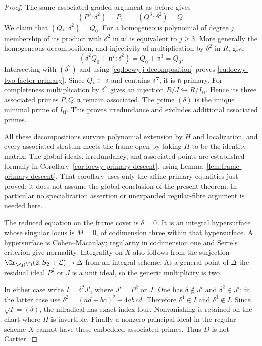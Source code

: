 \begin{proof}
The same associated-graded argument as before gives
\[
 (P^3:\delta^2)=P,\qquad (Q^3:\delta^2)=Q.
\]
We claim that $(Q_*:\delta^2)=Q_0$. For a homogeneous polynomial
of degree $j$, membership of its product with $\delta^2$ in
$\mathfrak n^7$ is equivalent to $j\ge3$. More generally the
homogeneous decomposition, and injectivity of multiplication by
$\delta^2$ in $R$, give
\[
 (\delta^2Q_0+\mathfrak n^7:\delta^2)
       =Q_0+\mathfrak n^3=Q_0.
\]
Intersecting with $(\delta^2)$ and using
\eqref{eq:loewy-j-decomposition} proves
\eqref{eq:loewy-two-factor-primary}. Since $Q_*\subset\mathfrak n$
and contains $\mathfrak n^7$, it is $\mathfrak n$-primary.
For completeness multiplication by $\delta^2$ gives an injection
$R/J\hookrightarrow R/I_{\mathrm{tf}}$. Hence its three associated
primes $P,Q,\mathfrak n$ remain associated. The prime $(\delta)$
is the unique minimal prime of $I_{\mathrm{tf}}$. This proves
irredundance and excludes additional associated primes.

All these decompositions survive polynomial extension by $H$ and
localization, and every associated stratum meets the frame open
by taking $H$ to be the identity matrix. The global ideals,
irredundancy, and associated points are established formally in
Corollary~\ref{cor:loewy-primary-descent}, using
Lemma~\ref{lem:frame-primary-descent}. That corollary uses only
the affine primary equalities just proved; it does not assume the
global conclusion of the present theorem. In particular no
specialization assertion or unexpanded regular-fibre argument is
needed here.

The reduced equation on the frame cover is $\delta=0$. It is an
integral hypersurface whose singular locus is $M=0$, of codimension
three within that hypersurface. A hypersurface is Cohen--Macaulay;
regularity in codimension one and Serre's criterion give normality.
Integrality on $X$ also follows from the surjection
$\Gr_{\Pj(V)}(2,S_2+\mathcal L)\to\Delta$ from an integral scheme.
At a general point of $\Delta$ the residual ideal $P^2$ or $J$ is a
unit ideal, so the generic multiplicity is two.

In either case write $I=\delta^2J'$, where $J'=P^2$ or $J$.
One has $\delta\notin J'$ and $\delta^2\in J'$; in the latter
case use
$\delta^2=(ad+bc)^2-4ab\,cd$.
Therefore $\delta^4\in I$ and $\delta^3\notin I$.
Since $\sqrt I=(\delta)$, the nilradical has exact index four.
Nonvanishing is retained on the chart where $H$ is invertible.
Finally a nonzero principal ideal in the regular scheme $X$ cannot
have these embedded associated primes. Thus $D$ is not Cartier.
\end{proof}

